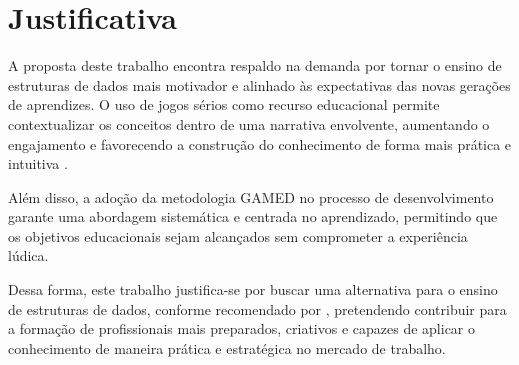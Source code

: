 \section{Justificativa}

A proposta deste trabalho encontra respaldo na demanda por tornar o
ensino de estruturas de dados mais motivador e alinhado às expectativas das
novas gerações de aprendizes. O uso de jogos sérios como recurso educacional
permite contextualizar os conceitos dentro de uma narrativa envolvente,
aumentando o engajamento e favorecendo a construção do conhecimento de forma
mais prática e intuitiva \cite{mouaheb2012serious}.

Além disso, a adoção da metodologia GAMED \cite{aslan2015gamed} no processo de desenvolvimento
garante uma abordagem sistemática e centrada no aprendizado, permitindo que os
objetivos educacionais sejam alcançados sem comprometer a experiência lúdica.

Dessa forma, este trabalho justifica-se por buscar uma alternativa para o
ensino de estruturas de dados, conforme recomendado por
, pretendendo contribuir para a formação de
profissionais mais preparados, criativos e capazes de aplicar o conhecimento de
maneira prática e estratégica no mercado de trabalho.
